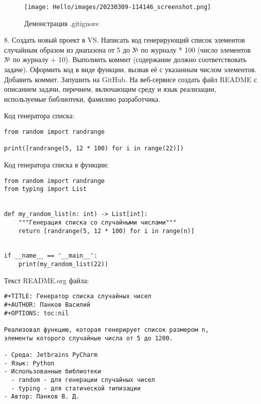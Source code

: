 \documentclass[a4paper,14pt]{extarticle}
\begin{document}
\begin{figure}[htbp]
\centering
\texttt{[image: Hello/images/20230309-114146\_screenshot.png]}
\caption{Демонстрация .gitignore}
\end{figure}

\clearpage

​8. Создать новый проект в VS.
Написать код генерирующий список элементов случайным образом из диапазона
от 5 до № по журналу * 100 (число элементов № по журналу + 10).
Выполнить коммит (содержание должно соответствовать задаче).
Оформить код в виде функции, вызвав её с указанным числом элементов.
Добавить коммит. Запушить на GitHub.
На веб-сервисе создать файл README с описанием задачи,
перечнем, включающим среду и язык реализации,
используемые библиотеки, фамилию разработчика.


Код генератора списка:
\begin{verbatim}
from random import randrange

print([randrange(5, 12 * 100) for i in range(22)])
\end{verbatim}

Код генератора списка в функции:
\begin{verbatim}
from random import randrange
from typing import List


def my_random_list(n: int) -> List[int]:
	"""Генерация списка со случайными числами"""
	return [randrange(5, 12 * 100) for i in range(n)]


if __name__ == '__main__':
	print(my_random_list(22))

\end{verbatim}

Текст README.org файла:
\begin{verbatim}
#+TITLE: Генератор списка случайных чисел
#+AUTHOR: Панков Василий
#+OPTIONS: toc:nil

Реализовал функцию, которая генерирует список размером n,
элементы которого случайные числа от 5 до 1200.

- Среда: Jetbrains PyCharm
- Язык: Python
- Использованные библиотеки
  - random - для генерации случайных чисел
  - typing - для статической типизации
- Автор: Панков В. Д.

\end{verbatim}
\end{document}
